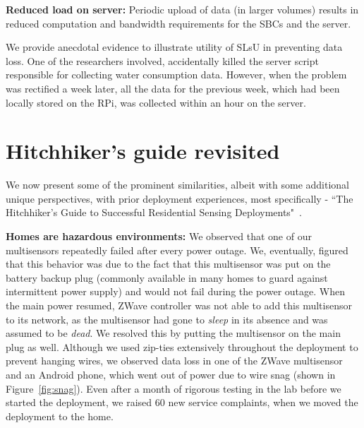 \documentclass[10pt]{sensys-proc}
\newcommand{\figref}[1]{Figure~\ref{#1}}
\newcommand{\selstups}{SLsU }
\begin{document}
\noindent \textbf{Reduced load on server:} Periodic upload of data (in larger volumes) results in reduced computation and bandwidth requirements for the SBCs and the server. 

We provide anecdotal evidence to illustrate utility of \selstups in preventing data loss. One of the researchers involved, accidentally killed the server script responsible for collecting water consumption data. However, when the problem was rectified a week later, all the data for the previous week, which had been locally stored on the RPi, was collected within an hour on the server. 


\vspace{-1mm}
\section{Hitchhiker's guide revisited}
\label{sec:common}
We now present some of the prominent similarities, albeit with some additional unique perspectives, with prior deployment experiences, most specifically - ``The Hitchhiker's Guide to Successful Residential Sensing Deployments"~\cite{hitchhiker_residential}. 

\noindent \textbf{Homes are hazardous environments:} We observed that one of our multisensors repeatedly failed after every power outage. %
We, eventually, figured that this behavior was due to the fact that this multisensor was put on the battery backup plug (commonly available in many homes to guard against intermittent power supply) and would not fail during the power outage. When the main power resumed, ZWave controller was not able to add this multisensor to its network, as the multisensor had gone to \emph{sleep} in its absence and was assumed to be \emph{dead}. We resolved this by putting the multisensor on the main plug as well. %
Although we used zip-ties extensively throughout the deployment to prevent hanging wires, we observed data loss in one of the ZWave multisensor and an Android phone, which went out of power due to wire snag (shown in \figref{fig:snag}). Even after a month of rigorous testing in the lab before we started the deployment, we raised 60 new service complaints, when we moved the deployment to the home. %
\end{document}
